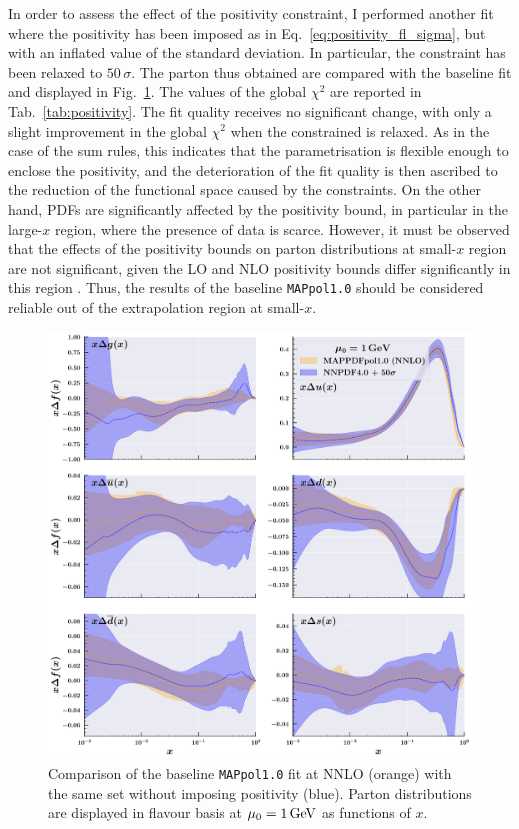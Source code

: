 In order to assess the effect of the positivity constraint, I performed another fit where the positivity has been imposed as in Eq.~\eqref{eq:positivity_fl_sigma}, but with an inflated value of the standard deviation. In particular, the constraint has been relaxed to $50 \, \sigma$. The parton thus obtained are compared with the baseline fit and displayed in Fig.~\ref{fig:positivity}. The values of the global $\chi^2$ are reported in Tab.~\ref{tab:positivity}. The fit quality receives no significant change, with only a slight improvement in the global $\chi^2$ when the constrained is relaxed. As in the case of the sum rules, this indicates that the parametrisation is flexible enough to enclose the positivity, and the deterioration of the fit quality is then ascribed to the reduction of the functional space caused by the constraints. On the other hand, PDFs are significantly affected by the positivity bound, in particular in the large-$x$ region, where the presence of data is scarce. However, it must be observed that the effects of the positivity bounds on parton distributions at small-$x$ region are not significant, given the LO and NLO positivity bounds differ significantly in this region \cite{Altarelli:1998gn}. Thus, the results of the baseline \texttt{MAPpol1.0} should be considered reliable out of the extrapolation region at small-$x$.

\begin{figure}[t!]
  \centering
  \includegraphics[width=\textwidth]{Chapters/Chapter_4/figs/positivity.pdf}
  \caption{\small{Comparison of the baseline \texttt{MAPpol1.0} fit at NNLO (orange) with the same set without imposing positivity (blue). Parton distributions are displayed in flavour basis at $\mu_0 = 1 \, \textrm{GeV}$ as functions of $x$.}}
  \label{fig:positivity}
\end{figure}

